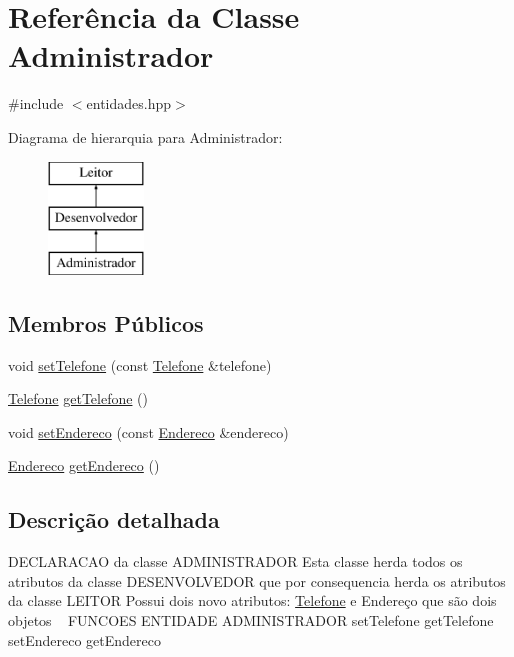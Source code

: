 \hypertarget{class_administrador}{}\section{Referência da Classe Administrador}
\label{class_administrador}


{\ttfamily \#include $<$entidades.\+hpp$>$}

Diagrama de hierarquia para Administrador\+:\begin{figure}[H]
\begin{center}
\leavevmode
\includegraphics[height=3.000000cm]{class_administrador}
\end{center}
\end{figure}
\subsection*{Membros Públicos}
\begin{DoxyCompactItemize}
\item 
void \mbox{\hyperlink{class_administrador_ac841526561c3daf57f39ffd41e7211f2}{set\+Telefone}} (const \mbox{\hyperlink{class_telefone}{Telefone}} \&telefone)
\item 
\mbox{\hyperlink{class_telefone}{Telefone}} \mbox{\hyperlink{class_administrador_a2b7dddbf1e34a91a5f97c761332ce60b}{get\+Telefone}} ()
\item 
void \mbox{\hyperlink{class_administrador_afe7a5d85ee5c6a43a56b1a47daff358e}{set\+Endereco}} (const \mbox{\hyperlink{class_endereco}{Endereco}} \&endereco)
\item 
\mbox{\hyperlink{class_endereco}{Endereco}} \mbox{\hyperlink{class_administrador_a217b60a7f414efc581446eece222c6cf}{get\+Endereco}} ()
\end{DoxyCompactItemize}


\subsection{Descrição detalhada}
D\+E\+C\+L\+A\+R\+A\+C\+AO da classe A\+D\+M\+I\+N\+I\+S\+T\+R\+A\+D\+OR Esta classe herda todos os atributos da classe D\+E\+S\+E\+N\+V\+O\+L\+V\+E\+D\+OR que por consequencia herda os atributos da classe L\+E\+I\+T\+OR Possui dois novo atributos\+: \mbox{\hyperlink{class_telefone}{Telefone}} e Endereço que são dois objetos ~\newline
F\+U\+N\+C\+O\+ES E\+N\+T\+I\+D\+A\+DE A\+D\+M\+I\+N\+I\+S\+T\+R\+A\+D\+OR set\+Telefone get\+Telefone set\+Endereco get\+Endereco 

